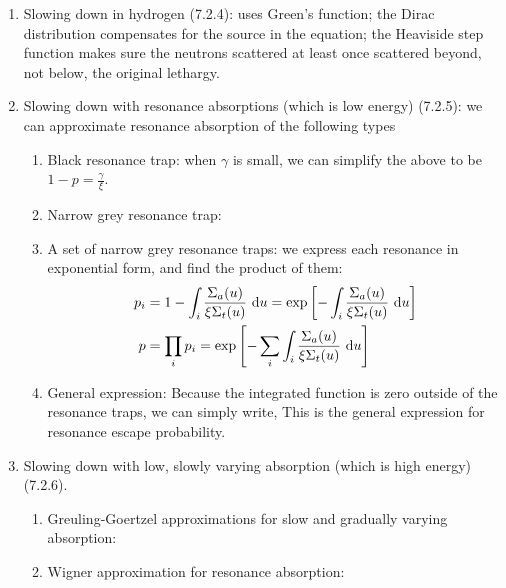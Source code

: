 \documentclass{school-22.211-notes}
\begin{document}
\begin{enumerate}
\item Slowing down in hydrogen (7.2.4): uses Green's function; the Dirac distribution compensates for the source in the equation; the Heaviside step function makes sure the neutrons scattered at least once scattered beyond, not below, the original lethargy. 
\item Slowing down with resonance absorptions (which is low energy) (7.2.5): we can approximate resonance absorption of the following types
  \begin{enumerate}
    \item Black resonance trap: 
      when $\gamma$ is small, we can simplify the above to be $1 - p = \frac{\gamma}{\xi}$. 
    \item Narrow grey resonance trap:
    \item A set of narrow grey resonance traps: we express each resonance in exponential form, and find the product of them:
      \begin{align}
        p_i &= 1 - \int_i \frac{\Sigma_a(u)}{\xi \Sigma_t (u)} \mbox{ }\mathrm{d} u = \exp \left[ -\int_i \frac{\Sigma_a(u)}{\xi \Sigma_t(u)} \mbox{ }\mathrm{d} u \right] \\
        p &= \prod_i p_i = \exp \left[ - \displaystyle\sum_i \int_i \frac{\Sigma_a(u)}{\xi \Sigma_t(u)} \mbox{ }\mathrm{d} u \right]
      \end{align}
    \item General expression:
      Because the integrated function is zero outside of the resonance traps, we can simply write,
      This is the general expression for resonance escape probability. 
  \end{enumerate}
\item Slowing down with low, slowly varying absorption (which is high energy) (7.2.6). 

  \begin{enumerate}
  \item Greuling-Goertzel approximations for slow and gradually varying absorption: 
  \item Wigner approximation for resonance absorption: 
  \end{enumerate}
\end{enumerate}
\end{document}
